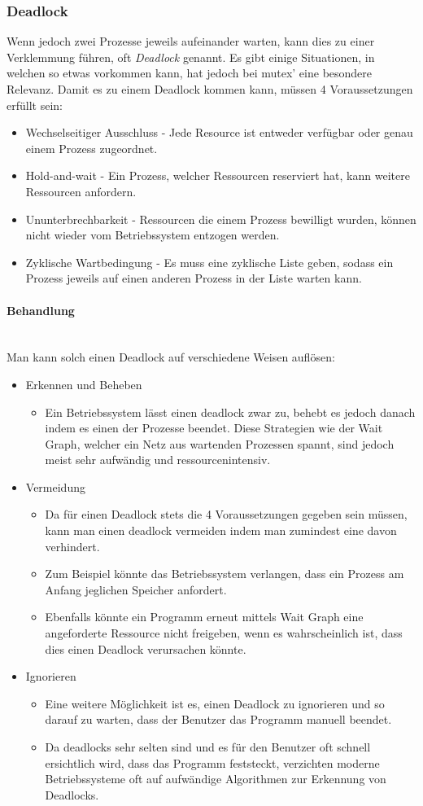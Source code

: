 \documentclass{article}
\newcommand{\paragraphlb}[1]{\paragraph{#1}\mbox{}\\}
\begin{document}
	 \subsubsection{Deadlock}
	 Wenn jedoch zwei Prozesse jeweils aufeinander warten, kann dies zu einer Verklemmung führen, oft \textit{Deadlock} genannt. Es gibt einige Situationen, in welchen so etwas vorkommen kann, hat jedoch bei mutex' eine besondere Relevanz. Damit es zu einem Deadlock kommen kann, müssen 4 Voraussetzungen erfüllt sein:
	 \begin{itemize}
	 	\item{Wechselseitiger Ausschluss - Jede Resource ist entweder verfügbar oder genau einem Prozess zugeordnet.}
	 	\item{Hold-and-wait - Ein Prozess, welcher Ressourcen reserviert hat, kann weitere Ressourcen anfordern.}
	 	\item{Ununterbrechbarkeit - Ressourcen die einem Prozess bewilligt wurden, können nicht wieder vom Betriebssystem entzogen werden.}
	 	\item{Zyklische Wartbedingung - Es muss eine zyklische Liste geben, sodass ein Prozess jeweils auf einen anderen Prozess in der Liste warten kann.}
	 \end{itemize}
	 \paragraphlb{Behandlung}
	 Man kann solch einen Deadlock auf verschiedene Weisen auflösen:
	 \begin{itemize}
	 	\item{Erkennen und Beheben}
	 	\begin{itemize}
	 		\item{Ein Betriebssystem lässt einen deadlock zwar zu, behebt es jedoch danach indem es einen der Prozesse beendet. Diese Strategien wie der Wait Graph, welcher ein Netz aus wartenden Prozessen spannt, sind jedoch meist sehr aufwändig und ressourcenintensiv.}
	 	\end{itemize}
	 	\item{Vermeidung}
	 	\begin{itemize}
	 		\item{Da für einen Deadlock stets die 4 Voraussetzungen gegeben sein müssen, kann man einen deadlock vermeiden indem man zumindest eine davon verhindert.}
	 		\item{Zum Beispiel könnte das Betriebssystem verlangen, dass ein Prozess am Anfang jeglichen Speicher anfordert.}
	 		\item{Ebenfalls könnte ein Programm erneut mittels Wait Graph eine angeforderte Ressource nicht freigeben, wenn es wahrscheinlich ist, dass dies einen Deadlock verursachen könnte.}
	 	\end{itemize}
	 	\item{Ignorieren}
	 	\begin{itemize}
	 		\item{Eine weitere Möglichkeit ist es, einen Deadlock zu ignorieren und so darauf zu warten, dass der Benutzer das Programm manuell beendet.}
	 		\item{Da deadlocks sehr selten sind und es für den Benutzer oft schnell ersichtlich wird, dass das Programm feststeckt, verzichten moderne Betriebssysteme oft auf aufwändige Algorithmen zur Erkennung von Deadlocks.}
	 	\end{itemize}
	 \end{itemize}
\end{document}

